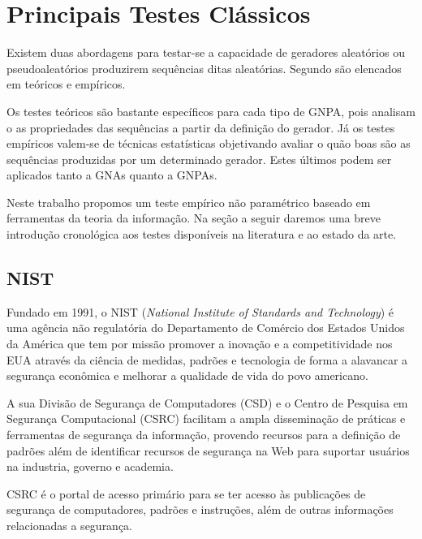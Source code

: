 \section{Principais Testes Clássicos} %

Existem duas abordagens para testar-se a capacidade de geradores aleatórios ou pseudoaleatórios produzirem sequências ditas aleatórias.
Segundo \citet{LEcuyer:92} são elencados em teóricos e empíricos.

Os testes teóricos são bastante específicos para cada tipo de GNPA, pois analisam o as propriedades das sequências a partir da definição do gerador.
Já os testes empíricos valem-se de técnicas estatísticas objetivando avaliar o quão boas são as sequências produzidas por um determinado gerador.
Estes últimos podem ser aplicados tanto a GNAs quanto a GNPAs.

Neste trabalho propomos um teste empírico não paramétrico baseado em ferramentas da teoria da informação.
Na seção a seguir daremos uma breve introdução cronológica aos testes disponíveis na literatura e ao estado da arte.
  
 
 \subsection{NIST}
 
Fundado em 1991, o NIST (\textit{National Institute of Standards and Technology}) é uma agência não regulatória do Departamento de Comércio dos Estados Unidos da América que tem por missão promover a inovação e a competitividade nos EUA através da ciência de medidas, padrões e tecnologia de forma a alavancar a segurança econômica e melhorar a qualidade de vida do povo americano.

A sua Divisão de Segurança de Computadores (CSD) e o Centro de Pesquisa em Segurança Computacional (CSRC) facilitam a ampla disseminação de práticas e ferramentas de segurança da informação, provendo recursos para a definição de padrões além de identificar recursos de segurança na Web para suportar usuários na industria, governo e academia. 

CSRC é o portal de acesso primário para se ter acesso às publicações de segurança de computadores, padrões e instruções, além de outras informações relacionadas a segurança.

